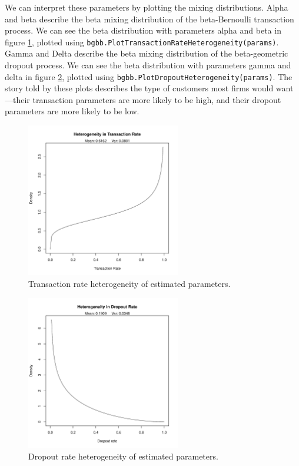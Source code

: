 \documentclass[10pt, letterpaper, onecolumn, oneside, final]{article}\usepackage[]{graphicx}\usepackage[]{color}
\begin{document}
We can interpret these parameters by plotting the mixing
distributions. Alpha and beta describe the beta mixing distribution of
the beta-Bernoulli transaction process. We can see the beta
distribution with parameters alpha and beta in figure
\ref{fig:bgbbTransactionHeterogeneity}, plotted using
\texttt{bgbb.PlotTransactionRateHeterogeneity(params)}. Gamma and
Delta describe the beta mixing distribution of the beta-geometric
dropout process. We can see the beta distribution with parameters
gamma and delta in figure \ref{fig:bgbbDropoutHeterogeneity}, plotted
using \texttt{bgbb.PlotDropoutHeterogeneity(params)}. The story told
by these plots describes the type of customers most firms would
want---their transaction parameters are more likely to be high, and
their dropout parameters are more likely to be low.



\begin{figure}
  \begin{center}
  \includegraphics[width=0.6\textwidth]{figure/bgbbTransactionHeterogeneity}
  \caption{Transaction rate heterogeneity of estimated parameters.}\label{fig:bgbbTransactionHeterogeneity}
  \end{center}
\end{figure}
      


\begin{figure}
  \begin{center}
  \includegraphics[width=0.6\textwidth]{figure/bgbbDropoutHeterogeneity}
  \caption{Dropout rate heterogeneity of estimated parameters.}\label{fig:bgbbDropoutHeterogeneity}
  \end{center}
\end{figure}
\end{document}
